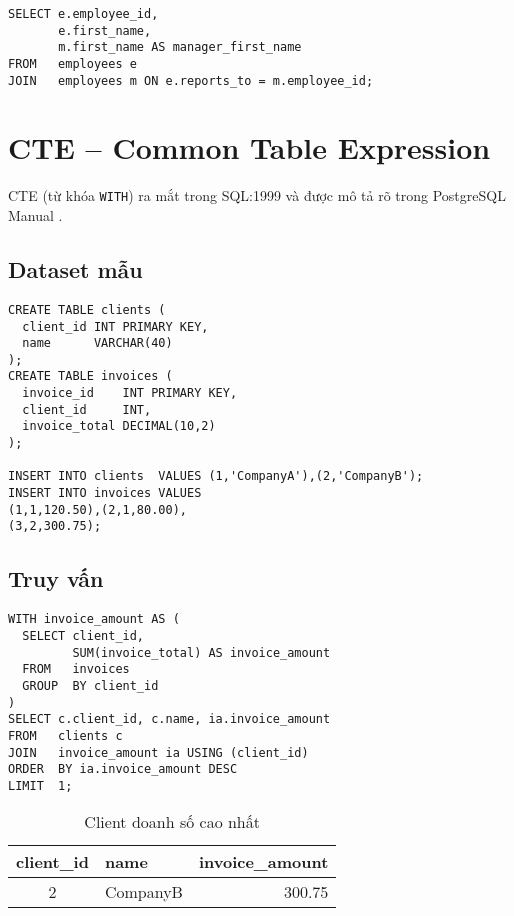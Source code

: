 \begin{lstlisting}[caption={SELF JOIN lấy tên nhân viên và quản lý}]
SELECT e.employee_id,
       e.first_name,
       m.first_name AS manager_first_name
FROM   employees e
JOIN   employees m ON e.reports_to = m.employee_id;
\end{lstlisting}

\section{CTE – Common Table Expression}

CTE (từ khóa \texttt{WITH}) ra mắt trong SQL:1999 và được mô tả rõ trong PostgreSQL Manual \cite{postgresql_docs}.

\subsection{Dataset mẫu}

\begin{lstlisting}[caption={Tạo bảng invoices và clients}]
CREATE TABLE clients (
  client_id INT PRIMARY KEY,
  name      VARCHAR(40)
);
CREATE TABLE invoices (
  invoice_id    INT PRIMARY KEY,
  client_id     INT,
  invoice_total DECIMAL(10,2)
);

INSERT INTO clients  VALUES (1,'CompanyA'),(2,'CompanyB');
INSERT INTO invoices VALUES
(1,1,120.50),(2,1,80.00),
(3,2,300.75);
\end{lstlisting}

\subsection{Truy vấn}

\begin{lstlisting}[caption={CTE tìm khách có tổng hóa đơn cao nhất}]
WITH invoice_amount AS (
  SELECT client_id,
         SUM(invoice_total) AS invoice_amount
  FROM   invoices
  GROUP  BY client_id
)
SELECT c.client_id, c.name, ia.invoice_amount
FROM   clients c
JOIN   invoice_amount ia USING (client_id)
ORDER  BY ia.invoice_amount DESC
LIMIT  1;
\end{lstlisting}

\begin{table}[H]
\centering
\caption{Client doanh số cao nhất}
\begin{tabular}{|c|l|r|}
\hline
client\_id & name      & invoice\_amount \\ \hline
2 & CompanyB & 300.75 \\ \hline
\end{tabular}
\end{table}

